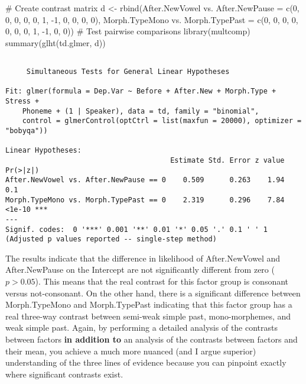 \documentclass[
  10pt,
  letterpaper]{article}
\newenvironment{Shaded}{\begin{snugshade}}{\end{snugshade}}
\newcommand{\AttributeTok}[1]{\textcolor[rgb]{0.40,0.45,0.13}{#1}}
\newcommand{\CommentTok}[1]{\textcolor[rgb]{0.37,0.37,0.37}{#1}}
\newcommand{\DecValTok}[1]{\textcolor[rgb]{0.68,0.00,0.00}{#1}}
\newcommand{\FunctionTok}[1]{\textcolor[rgb]{0.28,0.35,0.67}{#1}}
\newcommand{\NormalTok}[1]{\textcolor[rgb]{0.00,0.23,0.31}{#1}}
\newcommand{\OtherTok}[1]{\textcolor[rgb]{0.00,0.23,0.31}{#1}}
\newcommand{\SpecialCharTok}[1]{\textcolor[rgb]{0.37,0.37,0.37}{#1}}
\newcommand{\StringTok}[1]{\textcolor[rgb]{0.13,0.47,0.30}{#1}}
\renewcommand\texttt[1]{{\ttfamily\color{BrickRed}#1}}
\begin{document}
\begin{Shaded}
\begin{Highlighting}[]
\CommentTok{\# Create contrast matrix}
\NormalTok{d }\OtherTok{\textless{}{-}} \FunctionTok{rbind}\NormalTok{(}\StringTok{\textasciigrave{}}\AttributeTok{After.NewVowel vs. After.NewPause}\StringTok{\textasciigrave{}} \OtherTok{=} \FunctionTok{c}\NormalTok{(}\DecValTok{0}\NormalTok{,}
    \DecValTok{0}\NormalTok{, }\DecValTok{0}\NormalTok{, }\DecValTok{0}\NormalTok{, }\DecValTok{0}\NormalTok{, }\DecValTok{1}\NormalTok{, }\SpecialCharTok{{-}}\DecValTok{1}\NormalTok{, }\DecValTok{0}\NormalTok{, }\DecValTok{0}\NormalTok{, }\DecValTok{0}\NormalTok{, }\DecValTok{0}\NormalTok{), }\StringTok{\textasciigrave{}}\AttributeTok{Morph.TypeMono vs. Morph.TypePast}\StringTok{\textasciigrave{}} \OtherTok{=} \FunctionTok{c}\NormalTok{(}\DecValTok{0}\NormalTok{,}
    \DecValTok{0}\NormalTok{, }\DecValTok{0}\NormalTok{, }\DecValTok{0}\NormalTok{, }\DecValTok{0}\NormalTok{, }\DecValTok{0}\NormalTok{, }\DecValTok{0}\NormalTok{, }\DecValTok{1}\NormalTok{, }\SpecialCharTok{{-}}\DecValTok{1}\NormalTok{, }\DecValTok{0}\NormalTok{, }\DecValTok{0}\NormalTok{))}
\CommentTok{\# Test pairwise comparisons}
\FunctionTok{library}\NormalTok{(multcomp)}
\FunctionTok{summary}\NormalTok{(}\FunctionTok{glht}\NormalTok{(td.glmer, d))}
\end{Highlighting}
\end{Shaded}

\begin{verbatim}

     Simultaneous Tests for General Linear Hypotheses

Fit: glmer(formula = Dep.Var ~ Before + After.New + Morph.Type + Stress + 
    Phoneme + (1 | Speaker), data = td, family = "binomial", 
    control = glmerControl(optCtrl = list(maxfun = 20000), optimizer = "bobyqa"))

Linear Hypotheses:
                                       Estimate Std. Error z value Pr(>|z|)    
After.NewVowel vs. After.NewPause == 0    0.509      0.263    1.94      0.1    
Morph.TypeMono vs. Morph.TypePast == 0    2.319      0.296    7.84   <1e-10 ***
---
Signif. codes:  0 '***' 0.001 '**' 0.01 '*' 0.05 '.' 0.1 ' ' 1
(Adjusted p values reported -- single-step method)
\end{verbatim}

The results indicate that the difference in likelihood of
\texttt{After.NewVowel} and \texttt{After.NewPause} on the
\texttt{Intercept} are not significantly different from zero
(\(p>0.05\)). This means that the real contrast for this factor group is
consonant versus not-consonant. On the other hand, there is a
significant difference between \texttt{Morph.TypeMono} and
\texttt{Morph.TypePast} indicating that this factor group has a real
three-way contrast between semi-weak simple past, mono-morphemes, and
weak simple past. Again, by performing a detailed analysis of the
contrasts between factors \textbf{in addition to} an analysis of the
contrasts between factors and their mean, you achieve a much more
nuanced (and I argue superior) understanding of the three lines of
evidence because you can pinpoint exactly where significant contrasts
exist.
\end{document}
